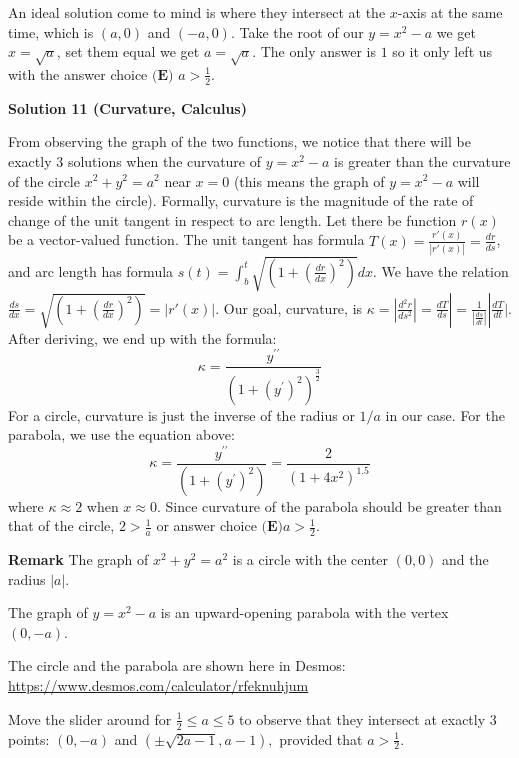 \begin{enumerate}
An ideal solution come to mind is where they intersect at the $x$-axis at the same time, which is $(a, 0)$ and $(-a, 0).$ Take the root of our $y=x^2-a$ we get $x=\sqrt{a}$, set them equal we get $a=\sqrt{a}.$ The only answer is $1$ so it only left us with the answer choice $\boxed{\textbf{(E) }a>\frac12}$.

 



\textbf{Solution 11 (Curvature, Calculus)}

From observing the graph of the two functions, we notice that there will be exactly 3 solutions when the curvature of $y = x^2-a$ is greater than the curvature of the circle $x^2+y^2 = a^2$ near $x=0$ (this means the graph of $y=x^2-a$ will reside within the circle). Formally, curvature is the magnitude of the rate of change of the unit tangent in respect to arc length. Let there be function $r(x)$ be a vector-valued function. The unit tangent has formula $T(x)=\frac{r'(x)}{|r'(x)|}=\frac{dr}{ds}$, and arc length has formula $s(t)=\int_b^{t}\sqrt{\left( 1+ \left( \frac{dr}{dx} \right) ^2 \right) }dx$. We have the relation $\frac{ds}{dx}=\sqrt{\left( 1+ \left( \frac{dr}{dx} \right) ^2 \right) }=|r'(x)|$. Our goal, curvature, is $\kappa= \left| \frac{d^2r}{ds^2} \right| =\frac{dT}{ds}|=\frac1{|\frac{ds}{dt}|}|\frac{dT}{dt}|$. After deriving, we end up with the formula:
 \[\kappa = \frac{y^{\prime\prime}}{(1+(y^{\prime})^2)^\frac{3}{2}}\]For a circle, curvature is just the inverse of the radius or $1/a$ in our case. For the parabola, we use the equation above:
 \[\kappa = \frac{y^{\prime\prime}}{(1+(y^{\prime})^2)} = \frac{2}{(1+4x^2)^{1.5}}\]where $\kappa \approx 2$ when $x \approx 0$. Since curvature of the parabola should be greater than that of the circle, $2>\frac{1}{a}$ or answer choice $\boxed{\textbf{(E)}a>\frac12}$.

 \textbf{Remark} The graph of $x^2+y^2=a^2$ is a circle with the center $(0,0)$ and the radius $|a|.$

 The graph of $y=x^2-a$ is an upward-opening parabola with the vertex $(0,-a).$

 The circle and the parabola are shown here in Desmos: \href{https://www.desmos.com/calculator/rfeknuhjum}{https://www.desmos.com/calculator/rfeknuhjum}

 Move the slider around for $\frac12\leq a\leq5$ to observe that they intersect at exactly $3$ points: $(0,-a)$ and $\left(\pm\sqrt{2a-1},a-1\right),$ provided that $a>\frac12.$





\end{enumerate}
